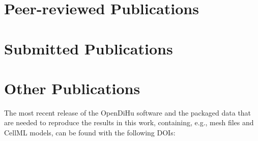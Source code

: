 



\nocite{Bradley:2018:EDB}
\nocite{Maier2019}
\nocite{Maier2021}
\nocite{summerschool2019}
\nocite{maier_benjamin_2021_4705945}
\nocite{opendihu}
\nocite{MaierSubmitted}






\section*{\vspace{-5mm}Peer-reviewed Publications}
\vspace{-5mm}
\printbibliography[category=own,heading=none,title=]

\section*{\vspace{-5mm}Submitted Publications}
\vspace{-5mm}
\printbibliography[category=own_submitted,heading=none,title=]

\section*{\vspace{-5mm}Other Publications}
\vspace{-5mm}
The most recent release of the OpenDiHu software and the packaged data that are needed to reproduce the results in this work, containing, e.g., mesh files and CellML models, can be found with the following DOIs:

\printbibliography[category=own_other,heading=none,title=]

